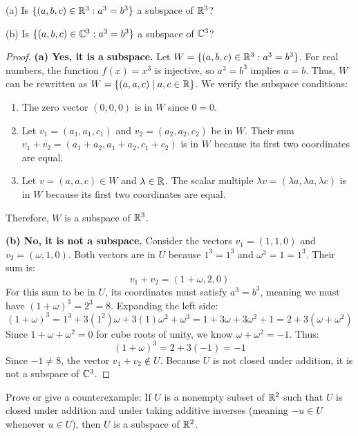 \begin{question}
	(a) \quad Is $\{(a, b, c) \in \mathbb{R}^3 : a^3 = b^3\}$ a subspace of $\mathbb{R}^3$?
	
	 \quad (b) \quad Is $\{(a, b, c) \in \mathbb{C}^3 : a^3 = b^3\}$ a subspace of $\mathbb{C}^3$?
\end{question}
\begin{proof}
	\textbf{(a) Yes, it is a subspace.}
	Let $W = \{(a, b, c) \in \mathbb{R}^3 : a^3 = b^3\}$. For real numbers, the function $f(x) = x^3$ is injective, so $a^3 = b^3$ implies $a = b$. Thus, $W$ can be rewritten as $W = \{(a, a, c) \mid a, c \in \mathbb{R}\}$. 
	We verify the subspace conditions:
	\begin{enumerate}
		\item {} The zero vector $(0, 0, 0)$ is in $W$ since $0 = 0$.
		\item {} Let $v_1 = (a_1, a_1, c_1)$ and $v_2 = (a_2, a_2, c_2)$ be in $W$. Their sum $v_1 + v_2 = (a_1+a_2, a_1+a_2, c_1+c_2)$ is in $W$ because its first two coordinates are equal.
		\item {} Let $v = (a, a, c) \in W$ and $\lambda \in \mathbb{R}$. The scalar multiple $\lambda v = (\lambda a, \lambda a, \lambda c)$ is in $W$ because its first two coordinates are equal.
	\end{enumerate}
	Therefore, $W$ is a subspace of $\mathbb{R}^3$.
	
	\vspace{1em}
	
	\textbf{(b) No, it is not a subspace.} 
	Consider the vectors $v_1 = (1, 1, 0)$ and $v_2 = (\omega, 1, 0)$. 
	Both vectors are in $U$ because $1^3 = 1^3$ and $\omega^3 = 1 = 1^3$.
	Their sum is:
	\[ v_1 + v_2 = (1+\omega, 2, 0) \]
	For this sum to be in $U$, its coordinates must satisfy $a^3 = b^3$, meaning we must have $(1+\omega)^3 = 2^3 = 8$. 
	Expanding the left side:
	\[ (1+\omega)^3 = 1^3 + 3(1^2)\omega + 3(1)\omega^2 + \omega^3 = 1 + 3\omega + 3\omega^2 + 1 = 2 + 3(\omega + \omega^2) \]
	Since $1 + \omega + \omega^2 = 0$ for cube roots of unity, we know $\omega + \omega^2 = -1$. Thus:
	\[ (1+\omega)^3 = 2 + 3(-1) = -1 \]
	Since $-1 \neq 8$, the vector $v_1 + v_2 \notin U$. Because $U$ is not closed under addition, it is not a subspace of $\mathbb{C}^3$.
\end{proof}
\begin{question}
	Prove or give a counterexample: If $U$ is a nonempty subset of $\mathbb{R}^2$ such that $U$ is closed under addition and under taking additive inverses (meaning $-u \in U$ whenever $u \in U$), then $U$ is a subspace of $\mathbb{R}^2$.
\end{question}
